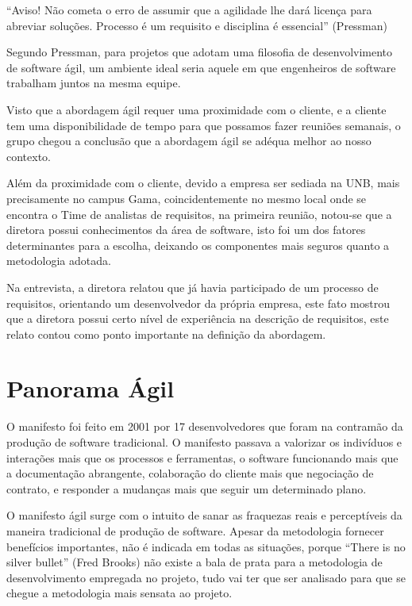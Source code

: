“Aviso! Não cometa o erro de assumir que a agilidade lhe dará licença para abreviar soluções. Processo é um requisito e disciplina é essencial” (Pressman)

Segundo Pressman, para projetos que adotam uma filosofia de desenvolvimento de software ágil, um ambiente ideal seria aquele em que engenheiros de software trabalham juntos na mesma equipe.

Visto que a abordagem ágil requer uma proximidade com o cliente, e a cliente tem uma disponibilidade de tempo para que possamos fazer reuniões semanais, o grupo chegou a conclusão que a abordagem ágil se adéqua melhor ao nosso contexto.

Além da proximidade com o cliente, devido a empresa ser sediada na UNB, mais precisamente no campus Gama, coincidentemente no mesmo local onde se encontra o Time de analistas de requisitos, na primeira reunião, notou-se que a diretora possui conhecimentos da área de software, isto foi um dos fatores determinantes para a escolha, deixando os componentes mais seguros quanto a metodologia adotada.

Na entrevista, a diretora relatou que já havia participado de um processo de requisitos, orientando um desenvolvedor da própria empresa, este fato mostrou que a diretora possui certo nível de experiência na descrição de requisitos, este relato contou como ponto importante na definição da abordagem.


\section {Panorama Ágil}

O manifesto foi feito em 2001 por 17 desenvolvedores que foram na contramão da produção de software tradicional. O manifesto passava a valorizar os indivíduos e interações mais que os processos e ferramentas, o software funcionando mais que a documentação abrangente, colaboração do cliente mais que negociação de contrato, e responder a mudanças mais que seguir um determinado plano.

O manifesto ágil surge com o intuito de sanar as fraquezas  reais e perceptíveis da maneira tradicional de produção de software. Apesar da metodologia fornecer benefícios importantes, não é indicada em todas as situações, porque “There is no silver bullet” (Fred Brooks) não existe a bala de prata para a metodologia de desenvolvimento empregada no projeto, tudo vai ter que ser analisado para que se chegue a metodologia mais sensata ao projeto.

